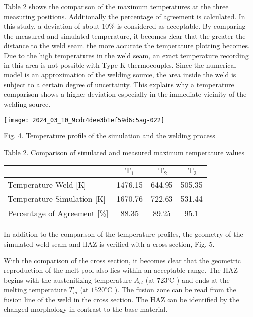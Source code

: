 \documentclass[10pt]{article}
\begin{document}
Table 2 shows the comparison of the maximum temperatures at the three measuring positions. Additionally the percentage of agreement is calculated. In this study, a deviation of about $10 \%$ is considered as acceptable. By comparing the measured and simulated temperature, it becomes clear that the greater the distance to the weld seam, the more accurate the temperature plotting becomes. Due to the high temperatures in the weld seam, an exact temperature recording in this area is not possible with Type $\mathrm{K}$ thermocouples. Since the numerical model is an approximation of the welding source, the area inside the weld is subject to a certain degree of uncertainty. This explains why a temperature comparison shows a higher deviation especially in the immediate vicinity of the welding source.

\begin{center}
\texttt{[image: 2024\_03\_10\_9cdc4dee3b1ef59d6c5ag-022]}
\end{center}

Fig. 4. Temperature profile of the simulation and the welding process

Table 2. Comparison of simulated and measured maximum temperature values

\begin{center}
\begin{tabular}{l|c|c|c}
\hline
 & $\mathrm{T}_{1}$ & $\mathrm{~T}_{2}$ & $\mathrm{~T}_{3}$ \\
\hline
Temperature Weld [K] & 1476.15 & 644.95 & 505.35 \\
Temperature Simulation [K] & 1670.76 & 722.63 & 531.44 \\
Percentage of Agreement [\%] & 88.35 & 89.25 & 95.1 \\
\hline
\end{tabular}
\end{center}

In addition to the comparison of the temperature profiles, the geometry of the simulated weld seam and HAZ is verified with a cross section, Fig. 5.

With the comparison of the cross section, it becomes clear that the geometric reproduction of the melt pool also lies within an acceptable range. The HAZ begins with the austenitizing temperature $A_{c l}$ (at $723{ }^{\circ} \mathrm{C}$ ) and ends at the melting temperature $T_{m}$ (at $1520^{\circ} \mathrm{C}$ ). The fusion zone can be read from the fusion line of the weld in the cross section. The HAZ can be identified by the changed morphology in contrast to the base material.
\end{document}
